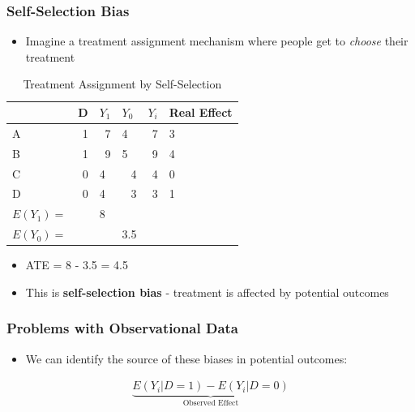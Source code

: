 \documentclass[xcolor=x11names,compress]{beamer}\usepackage[]{graphicx}\usepackage[]{color}
\renewcommand{\(}{\begin{columns}}
\renewcommand{\)}{\end{columns}}
\newcommand{\<}[1]{\begin{column}{#1}}
\renewcommand{\>}{\end{column}}
\begin{document}
\begin{frame}
\frametitle{Self-Selection Bias}
\begin{itemize}
\item Imagine a treatment assignment mechanism where people get to \textit{choose} their treatment
\end{itemize}
\begin{table}[htbp]
  \centering
  \caption{Treatment Assignment by Self-Selection}
    \begin{tabular}{|l|r|l|r|r|l|}
    \hline
          & \multicolumn{1}{l|}{D} & $Y_1$  & \multicolumn{1}{l|}{$Y_0$} & \multicolumn{1}{l|}{$Y_i$} & Real Effect \bigstrut\\
    \hline
    A     & 1     & \multicolumn{1}{r|}{\cellcolor{teal}7} & \multicolumn{1}{l|}{4} & 7     & 3 \bigstrut\\
    \hline
    B     & 1     & \multicolumn{1}{r|}{\cellcolor{teal}9} & \multicolumn{1}{l|}{5} & 9     & 4 \bigstrut\\
    \hline
    C     & 0     & 4     & \cellcolor{teal}4     & 4     & 0 \bigstrut\\
    \hline
    D     & 0     & 4     & \cellcolor{teal}3     & 3     & 1 \bigstrut\\
    \hline \pause
    $E(Y_1)=$ & & 8 & & \bigstrut\\
    \hline
    $E(Y_0)=$ & &  & 3.5 & \bigstrut\\
    \hline
    \end{tabular}%
\end{table}%
\begin{itemize}
\pause
\item ATE = 8 - 3.5 = 4.5
\item This is \textbf{self-selection bias} - treatment is affected by potential outcomes
\end{itemize}
\end{frame}

\begin{frame}
\frametitle{Problems with Observational Data}
\begin{itemize}
\item We can identify the source of these biases in potential outcomes:
\pause
\end{itemize}
\begin{multline}
\underbrace{E(Y_i|D=1)-E(Y_i|D=0)}_\text{Observed Effect}
\end{multline}
\end{frame}
\end{document}
